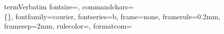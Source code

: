 \newcommand{\il}{\lstinline}
\newcommand{\lpQuestion}{\stepcounter{lpCount}\begin{multicols}{2}{\sq{\tiny\nhex{2}{\arabic{lpCount}}}}}
\newcommand{\lpQuestionN}{\begin{multicols}{2}}
\newcommand{\lpMonoQuestion}{\stepcounter{lpCount}\sq{\tiny\nhex{2}{\arabic{lpCount}}}}
\newcommand{\lpAnswer}{\hspace*{\fill}\vspace*{\fill}\columnbreak\\}
\newcommand{\lpAnswernowords}{\hspace*{\fill}\vspace*{\fill}\columnbreak\\\vspace*{-2em}}
\newcommand{\lpEnd}{\end{multicols}}
\newcommand{\lpNext}{\lpEnd\hrule\lpQuestion}
\newcommand{\lpNextN}{\lpEnd\hrule\lpQuestionN}
\newcommand{\askfirst}{\lpQuestion}
\newcommand{\ask}{\lpNext}
\newcommand{\answer}{\lpAnswer}
\newcommand{\answernowords}{\lpAnswernowords}
\newcommand{\askfirstN}{\lpQuestionN}
\newcommand{\askN}{\lpNextN}
\newcommand{\stopasking}{\lpEnd}

\DefineVerbatimEnvironment%
    {term}{Verbatim}
    {fontsize=\footnotesize, commandchars=\\\{\},
     fontfamily=courier, fontseries=b, frame=none, framerule=0.2mm,
    framesep=2mm, rulecolor=\color{MidnightBlue},
    formatcom=\color{MidnightBlue}
    }

\newcommand{\trm}[1]{\texttt{\footnotesize{\color{MidnightBlue}{#1}}}}
\newcommand{\key}[1]{\tc{orange}{#1}}
\newcommand{\returnkey}{\enskip{\key{$\hookleftarrow$}}}
\newcommand{\ltk}{\key{$\leftarrow$}}
\newcommand{\rtk}{\key{$\rightarrow$}}
\newcommand{\upk}{\key{$\uparrow$}}
\newcommand{\dnk}{\key{$\downarrow$}}
\newcommand{\tc}{\textcolor}
\newcommand{\wtf}{$\diamond$}
\newcommand{\etc}{$\hookleftarrow$}
\newcommand{\vd}{$\vdots$}

\renewcommand{\labelitemi}{$\rightarrow$}
\newsavebox{\lessonbox}
\newenvironment{lesson}
{\begin{lrbox}{\lessonbox}\begin{minipage}{0.9\linewidth}\medskip}
{\medskip\end{minipage}\end{lrbox}\framebox[1.1\width]{\usebox{\lessonbox}}}
